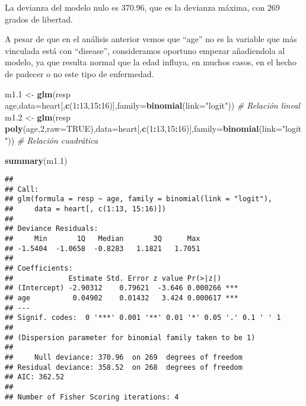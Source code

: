 \documentclass[]{article}
\newenvironment{Shaded}{\begin{snugshade}}{\end{snugshade}}
\newcommand{\KeywordTok}[1]{\textcolor[rgb]{0.13,0.29,0.53}{\textbf{#1}}}
\newcommand{\DataTypeTok}[1]{\textcolor[rgb]{0.13,0.29,0.53}{#1}}
\newcommand{\DecValTok}[1]{\textcolor[rgb]{0.00,0.00,0.81}{#1}}
\newcommand{\StringTok}[1]{\textcolor[rgb]{0.31,0.60,0.02}{#1}}
\newcommand{\CommentTok}[1]{\textcolor[rgb]{0.56,0.35,0.01}{\textit{#1}}}
\newcommand{\OtherTok}[1]{\textcolor[rgb]{0.56,0.35,0.01}{#1}}
\newcommand{\OperatorTok}[1]{\textcolor[rgb]{0.81,0.36,0.00}{\textbf{#1}}}
\newcommand{\NormalTok}[1]{#1}
\begin{document}
La devianza del modelo nulo es 370.96, que es la devianza máxima, con
269 grados de libertad.

A pesar de que en el análisis anterior vemos que ``age'' no es la
variable que más vinculada está con ``disease'', consideramos oportuno
empezar añadiendola al modelo, ya que resulta normal que la edad
influya, en muchos casos, en el hecho de padecer o no este tipo de
enfermedad.

\begin{Shaded}
\begin{Highlighting}[]
\NormalTok{m1.}\DecValTok{1}\NormalTok{ <-}\StringTok{  }\KeywordTok{glm}\NormalTok{(resp }\OperatorTok{~}\StringTok{ }\NormalTok{age,}\DataTypeTok{data=}\NormalTok{heart[,}\KeywordTok{c}\NormalTok{(}\DecValTok{1}\OperatorTok{:}\DecValTok{13}\NormalTok{,}\DecValTok{15}\OperatorTok{:}\DecValTok{16}\NormalTok{)],}\DataTypeTok{family=}\KeywordTok{binomial}\NormalTok{(}\DataTypeTok{link=}\StringTok{"logit"}\NormalTok{))  }\CommentTok{# Relación lineal}
\NormalTok{m1.}\DecValTok{2}\NormalTok{ <-}\StringTok{ }\KeywordTok{glm}\NormalTok{(resp }\OperatorTok{~}\StringTok{ }\KeywordTok{poly}\NormalTok{(age,}\DecValTok{2}\NormalTok{,}\DataTypeTok{raw=}\OtherTok{TRUE}\NormalTok{),}\DataTypeTok{data=}\NormalTok{heart[,}\KeywordTok{c}\NormalTok{(}\DecValTok{1}\OperatorTok{:}\DecValTok{13}\NormalTok{,}\DecValTok{15}\OperatorTok{:}\DecValTok{16}\NormalTok{)],}\DataTypeTok{family=}\KeywordTok{binomial}\NormalTok{(}\DataTypeTok{link=}\StringTok{"logit"}\NormalTok{))  }\CommentTok{# Relación cuadrática}

\KeywordTok{summary}\NormalTok{(m1.}\DecValTok{1}\NormalTok{)}
\end{Highlighting}
\end{Shaded}

\begin{verbatim}
## 
## Call:
## glm(formula = resp ~ age, family = binomial(link = "logit"), 
##     data = heart[, c(1:13, 15:16)])
## 
## Deviance Residuals: 
##     Min       1Q   Median       3Q      Max  
## -1.5404  -1.0658  -0.8283   1.1821   1.7051  
## 
## Coefficients:
##             Estimate Std. Error z value Pr(>|z|)    
## (Intercept) -2.90312    0.79621  -3.646 0.000266 ***
## age          0.04902    0.01432   3.424 0.000617 ***
## ---
## Signif. codes:  0 '***' 0.001 '**' 0.01 '*' 0.05 '.' 0.1 ' ' 1
## 
## (Dispersion parameter for binomial family taken to be 1)
## 
##     Null deviance: 370.96  on 269  degrees of freedom
## Residual deviance: 358.52  on 268  degrees of freedom
## AIC: 362.52
## 
## Number of Fisher Scoring iterations: 4
\end{verbatim}
\end{document}
